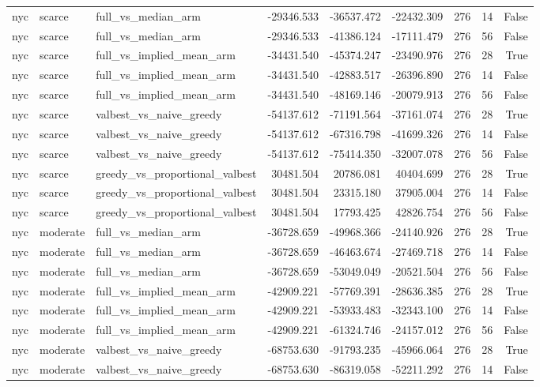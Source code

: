 \begin{tabular}{lllrrrrrr}
nyc & scarce & full\_vs\_median\_arm & -29346.533 & -36537.472 & -22432.309 & 276 & 14 & False \\
nyc & scarce & full\_vs\_median\_arm & -29346.533 & -41386.124 & -17111.479 & 276 & 56 & False \\
nyc & scarce & full\_vs\_implied\_mean\_arm & -34431.540 & -45374.247 & -23490.976 & 276 & 28 & True \\
nyc & scarce & full\_vs\_implied\_mean\_arm & -34431.540 & -42883.517 & -26396.890 & 276 & 14 & False \\
nyc & scarce & full\_vs\_implied\_mean\_arm & -34431.540 & -48169.146 & -20079.913 & 276 & 56 & False \\
nyc & scarce & valbest\_vs\_naive\_greedy & -54137.612 & -71191.564 & -37161.074 & 276 & 28 & True \\
nyc & scarce & valbest\_vs\_naive\_greedy & -54137.612 & -67316.798 & -41699.326 & 276 & 14 & False \\
nyc & scarce & valbest\_vs\_naive\_greedy & -54137.612 & -75414.350 & -32007.078 & 276 & 56 & False \\
nyc & scarce & greedy\_vs\_proportional\_valbest & 30481.504 & 20786.081 & 40404.699 & 276 & 28 & True \\
nyc & scarce & greedy\_vs\_proportional\_valbest & 30481.504 & 23315.180 & 37905.004 & 276 & 14 & False \\
nyc & scarce & greedy\_vs\_proportional\_valbest & 30481.504 & 17793.425 & 42826.754 & 276 & 56 & False \\
nyc & moderate & full\_vs\_median\_arm & -36728.659 & -49968.366 & -24140.926 & 276 & 28 & True \\
nyc & moderate & full\_vs\_median\_arm & -36728.659 & -46463.674 & -27469.718 & 276 & 14 & False \\
nyc & moderate & full\_vs\_median\_arm & -36728.659 & -53049.049 & -20521.504 & 276 & 56 & False \\
nyc & moderate & full\_vs\_implied\_mean\_arm & -42909.221 & -57769.391 & -28636.385 & 276 & 28 & True \\
nyc & moderate & full\_vs\_implied\_mean\_arm & -42909.221 & -53933.483 & -32343.100 & 276 & 14 & False \\
nyc & moderate & full\_vs\_implied\_mean\_arm & -42909.221 & -61324.746 & -24157.012 & 276 & 56 & False \\
nyc & moderate & valbest\_vs\_naive\_greedy & -68753.630 & -91793.235 & -45966.064 & 276 & 28 & True \\
nyc & moderate & valbest\_vs\_naive\_greedy & -68753.630 & -86319.058 & -52211.292 & 276 & 14 & False \\

\end{tabular}
